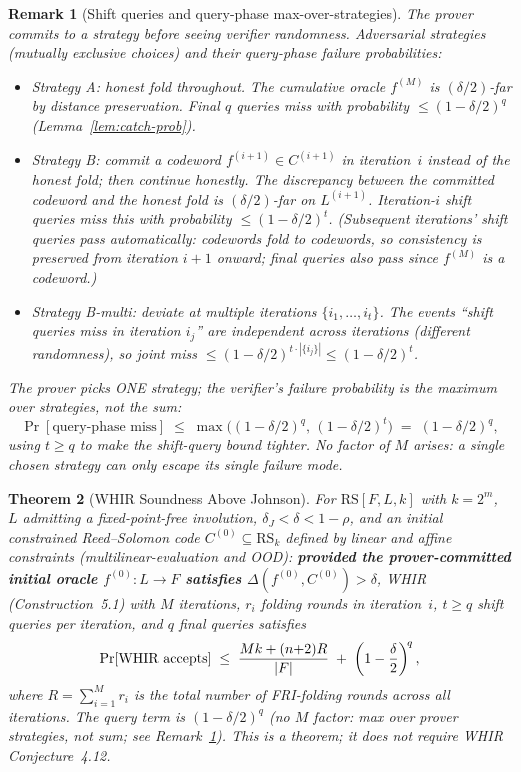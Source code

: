 \documentclass[11pt]{article}
\newtheorem{theorem}{Theorem}
\newtheorem{remark}[theorem]{Remark}
\newcommand{\RS}{\mathrm{RS}}
\begin{document}
\begin{remark}[Shift queries and query-phase max-over-strategies]
\label{rem:whir-shift}
The prover commits to a strategy before seeing verifier randomness. Adversarial strategies (mutually exclusive choices) and their query-phase failure probabilities:

\begin{itemize}[nosep]
\item \emph{Strategy A: honest fold throughout.} The cumulative oracle $f^{(M)}$ is $(\delta/2)$-far by distance preservation. Final $q$ queries miss with probability $\leq (1{-}\delta/2)^q$ (Lemma~\ref{lem:catch-prob}).
\item \emph{Strategy B: commit a codeword $f^{(i+1)} \in C^{(i+1)}$ in iteration~$i$ instead of the honest fold; then continue honestly.} The discrepancy between the committed codeword and the honest fold is $(\delta/2)$-far on $L^{(i+1)}$. Iteration-$i$ shift queries miss this with probability $\leq (1{-}\delta/2)^t$. (Subsequent iterations' shift queries pass automatically: codewords fold to codewords, so consistency is preserved from iteration $i{+}1$ onward; final queries also pass since $f^{(M)}$ is a codeword.)
\item \emph{Strategy B-multi: deviate at multiple iterations $\{i_1, \ldots, i_t\}$.} The events ``shift queries miss in iteration $i_j$'' are independent across iterations (different randomness), so joint miss $\leq (1{-}\delta/2)^{t \cdot |\{i_j\}|} \leq (1{-}\delta/2)^t$.
\end{itemize}

The prover picks ONE strategy; the verifier's failure probability is the maximum over strategies, not the sum:
$$\Pr[\text{query-phase miss}] \;\leq\; \max\bigl((1{-}\delta/2)^q,\, (1{-}\delta/2)^t\bigr) \;=\; (1{-}\delta/2)^q,$$
using $t \geq q$ to make the shift-query bound tighter. No factor of $M$ arises: a single chosen strategy can only escape its single failure mode.
\end{remark}

\begin{theorem}[WHIR Soundness Above Johnson]
\label{thm:whir-full}
For $\RS[F, L, k]$ with $k = 2^m$, $L$ admitting a fixed-point-free involution, $\delta_J < \delta < 1{-}\rho$, and an initial constrained Reed--Solomon code $C^{(0)} \subseteq \RS_k$ defined by linear and affine constraints (multilinear-evaluation and OOD): \textbf{provided the prover-committed initial oracle $f^{(0)}: L \to F$ satisfies $\Delta(f^{(0)}, C^{(0)}) > \delta$}, WHIR~\cite{WHIR} (Construction~5.1) with $M$ iterations, $r_i$ folding rounds in iteration~$i$, $t \geq q$ shift queries per iteration, and $q$ final queries satisfies
$$\Pr[\textup{WHIR accepts}] \;\leq\; \frac{Mk + (n{+}2)R}{|F|} \;+\; \left(1 - \frac{\delta}{2}\right)^{\!q},$$
where $R = \sum_{i=1}^M r_i$ is the total number of FRI-folding rounds across all iterations. The query term is $(1{-}\delta/2)^q$ (no $M$ factor: max over prover strategies, not sum; see Remark~\ref{rem:whir-shift}). \emph{This is a theorem; it does not require WHIR Conjecture~4.12.}
\end{theorem}
\end{document}
